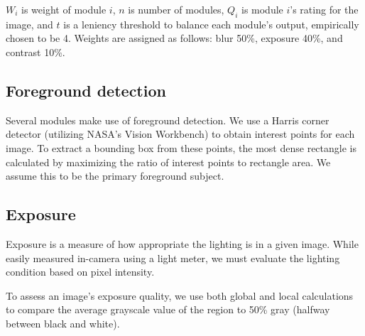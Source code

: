\documentclass{article}
\begin{document}
\(W_i\) is weight of module \(i\), \(n\) is number of modules, \(Q_i\) is  module \(i\)'s rating for the image, and \(t\) is a leniency threshold to balance each module's output, empirically chosen to be 4. Weights are assigned as follows: blur 50\%, exposure 40\%, and contrast 10\%.

\subsection{Foreground detection}\label{ContentRecognition}
Several modules make use of foreground detection. We use a Harris corner detector\cite{Harris} (utilizing NASA's Vision Workbench\cite{vision-workbench}) to obtain interest points for each image. To extract a bounding box from these points, the most dense rectangle is calculated by maximizing the ratio of interest points to rectangle area. We assume this to be the primary foreground subject.


\subsection{Exposure}
Exposure is a measure of how appropriate the lighting is in a given image. While easily measured in-camera using a light meter, we must evaluate the lighting condition based on pixel intensity.%


To assess an image's exposure quality, we use both global and local calculations to compare the average grayscale value of the region to 50\% gray (halfway between black and white).
\end{document}
